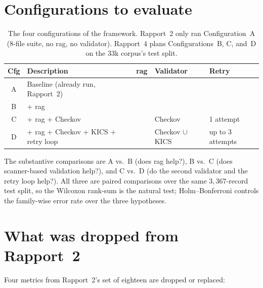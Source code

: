 \documentclass[12pt, a4paper]{report}
\newcommand{\cmark}{\ding{51}}
\newcommand{\xmark}{\ding{55}}
\begin{document}
\section{Configurations to evaluate}
\label{sec:configs}

\begin{table}[H]
  \centering
  \caption{The four configurations of the framework. Rapport~2 only ran
    Configuration~A (8-file suite, no \gls{rag}, no validator). Rapport~4
    plans Configurations~B, C, and~D on the 33k corpus's test split.}
  \label{tab:configs}
  \small
  \begin{tabularx}{\linewidth}{c X l l l}
    \toprule
    \textbf{Cfg} & \textbf{Description} & \textbf{\gls{rag}} & \textbf{Validator} & \textbf{Retry} \\
    \midrule
    A & Baseline (already run, Rapport~2)        & \xmark & \xmark & \xmark \\
    B & + \gls{rag}                              & \cmark & \xmark & \xmark \\
    C & + \gls{rag} + Checkov                    & \cmark & Checkov & 1 attempt \\
    D & + \gls{rag} + Checkov + KICS + retry loop& \cmark & Checkov $\cup$ KICS & up to 3 attempts \\
    \bottomrule
  \end{tabularx}
\end{table}

The substantive comparisons are A vs.~B (does \gls{rag} help?), B vs.~C
(does scanner-based validation help?), and C vs.~D (do the second validator
and the retry loop help?). All three are paired comparisons over the same
$3{,}367$-record test split, so the Wilcoxon rank-sum is the natural test;
Holm--Bonferroni controls the family-wise error rate over the three
hypotheses.

\section{What was dropped from Rapport~2}
\label{sec:dropped}

Four metrics from Rapport~2's set of eighteen are dropped or replaced:
\end{document}
